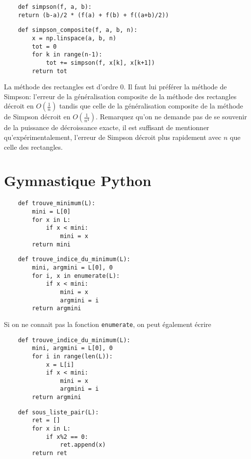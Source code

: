 \quessques \begin{verbatim}
    def simpson(f, a, b):
    return (b-a)/2 * (f(a) + f(b) + f((a+b)/2))
\end{verbatim}

\ssques \begin{verbatim}
    def simpson_composite(f, a, b, n):
        x = np.linspace(a, b, n)
        tot = 0
        for k in range(n-1):
            tot += simpson(f, x[k], x[k+1])
        return tot
\end{verbatim}

\ques La méthode des rectangles est d'ordre $ 0 $. Il faut lui préférer la méthode de Simpson: l'erreur de la généralisation composite de la méthode des rectangles décroit en $ O(\frac{1}{n}) $ tandis que celle de la généralisation composite de la méthode de Simpson décroit en $ O(\frac{1}{n^4}) $. Remarquez qu'on ne demande pas de se souvenir de la puissance de décroissance exacte, il est suffisant de mentionner qu'expérimentalement, l'erreur de Simpson décroit plus rapidement avec $ n $ que celle des rectangles.


\section*{Gymnastique Python}

\quessques \begin{verbatim}
    def trouve_minimum(L):
        mini = L[0]
        for x in L:
            if x < mini:
                mini = x
        return mini
\end{verbatim}

\ssques \begin{verbatim}
    def trouve_indice_du_minimum(L):
        mini, argmini = L[0], 0
        for i, x in enumerate(L):
            if x < mini:
                mini = x
                argmini = i
        return argmini
\end{verbatim}

Si on ne connait pas la fonction \texttt{enumerate}, on peut également écrire
\begin{verbatim}
    def trouve_indice_du_minimum(L):
        mini, argmini = L[0], 0
        for i in range(len(L)):
            x = L[i]
            if x < mini:
                mini = x
                argmini = i
        return argmini
\end{verbatim}

\ques 

\begin{verbatim}
    def sous_liste_pair(L):
        ret = []
        for x in L:
            if x%2 == 0:
                ret.append(x)
        return ret
\end{verbatim}

